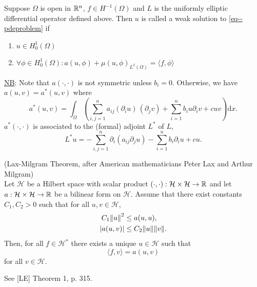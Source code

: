 \documentclass[11pt]{article}
\begin{document}
			\begin{defi}
				Suppose $\Omega$ is open in $\mathbb{R}^n$, $f\in H^{-1}(\Omega)$ and $L$ is the uniformly elliptic differential operator defined above. Then $u$ is called a weak solution to \eqref{eq--pdeproblem} if
				\begin{enumerate}
					\item $u\in H^1_0(\Omega)$
					\item $\forall\phi\in H^1_0(\Omega): a(u,\phi)+\mu(u,\phi)_{L^2(\Omega)}=\langle f,\phi\rangle$
				\end{enumerate}
			\end{defi}

			\noindent\underline{NB}: Note that $a(\cdot,\cdot)$ is not symmetric unless $b_i=0$. Otherwise, we have $a(u,v)=a^\ast(u,v)$ where
			\begin{equation}\label{def astar}
				a^\ast(u,v)=\int_\Omega\left(\sum_{i,j=1}^na_{ij}(\partial_i u)\, (\partial_j v) +\sum_{i=1}^nb_iu\partial_iv+cuv\right)\mathrm{d}x.
			\end{equation}
			$a^\ast(\cdot,\cdot)$ is associated to the (formal) adjoint $L^\ast$ of $L$,
			\begin{equation}\label{adjoint of L}
				L^\ast u=-\sum_{i,j=1}^n\partial_i(a_{ij}\partial_j u)-\sum_{i=1}^nb_i\partial_i u+cu.
			\end{equation} 

			\begin{thm}
				(Lax-Milgram Theorem, after American mathematicians Peter Lax and Arthur Milgram)\\ Let $\mathcal{H}$ be a Hilbert space with scalar product $(\cdot,\cdot):\mathcal{H}\times\mathcal{H}\rightarrow\mathbb{R}$ and let $a:\mathcal{H}\times\mathcal{H}\rightarrow\mathbb{R}$ be a bilinear form on $\mathcal{H}$. Assume that there exist constants $C_1,C_2>0$ such that for all $u,v\in\mathcal{H}$,
				\begin{align*}
					C_1\norm{u}^2&\le a(u,u),\\
					|a(u,v)|&\le C_2\norm{u}\norm{v}.
				\end{align*}
				Then, for all $f\in\mathcal{H}^\ast$ there exists a unique $u\in\mathcal{H}$ such that 
				\begin{equation*}
					\langle f,v\rangle=a(u,v)
				\end{equation*}
				for all $v\in\mathcal{H}$.
			\end{thm}
			\begin{pproof}
				See [LE] Theorem 1, p. 315.
			\end{pproof}
\end{document}
